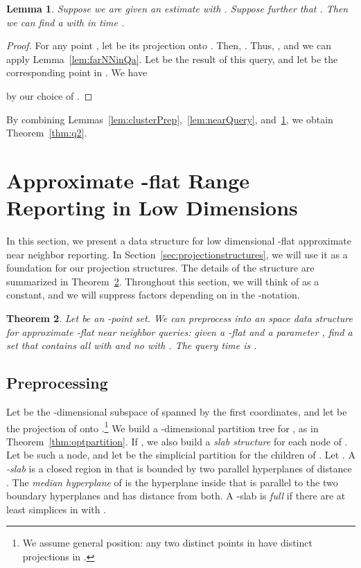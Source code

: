 \documentclass[a4paper,11pt]{paper}
\newtheorem{theorem} {Theorem}[section]
\newtheorem{lemma}[theorem]{Lemma}
\begin{document}
\begin{lemma}\label{lem:farQuery}
  Suppose we are given an estimate 
  with .
  Suppose further that .
  Then we can find a  with
   in
  time .
\end{lemma}
\begin{proof}
  For any point , let  be its projection
  onto . Then, .
  Thus, ,
  and we can apply Lemma~\ref{lem:farNNinQa}. Let
   be the result of this query, and let
   be the corresponding point in . We have
    
  by our choice of .
\end{proof}

By combining Lemmas~\ref{lem:clusterPrep},~\ref{lem:nearQuery},
and~\ref{lem:farQuery}, we obtain Theorem~\ref{thm:q2}.

\section{Approximate -flat Range Reporting in Low Dimensions}
\label{sec:lowdimstructure}

In this section, we present  a data structure for low dimensional
-flat approximate near neighbor reporting.
In Section~\ref{sec:projectionstructures}, we will use it as
a foundation for our projection structures.
The details of the structure are
summarized in Theorem~\ref{thm:lowdimstructure}.
Throughout this section,
we will think of  as a constant, and we will suppress
factors depending on  in the -notation.

\begin{theorem} \label{thm:lowdimstructure}
  Let  be an -point set.
  We can preprocess  into an  space data
  structure for approximate -flat near neighbor queries: given
  a -flat  and a parameter , find a set
   that contains all  with  and no  with
  . The
  query time is .
\end{theorem}

\subsection{Preprocessing}
\label{sec:lowdimpreproc}

Let  be the -dimensional subspace of 
spanned by the first  coordinates, and let  be the
projection of  onto .\footnote{We assume general position:
any two distinct points in  have distinct projections in .}
We build a -dimensional partition tree 
for , as in Theorem~\ref{thm:optpartition}.
If , we also build a \emph{slab structure}
for each node of .
Let  be such a node, and let  be the simplicial partition
for the children of .
Let . A \emph{-slab}  is a closed region in  that is
bounded by two parallel hyperplanes of distance .
The \emph{median hyperplane}  of  is the
hyperplane inside  that is parallel to the
two boundary hyperplanes and has distance  from both.
A -slab  is \emph{full} if there are at least 
simplices  in  with .
\end{document}
